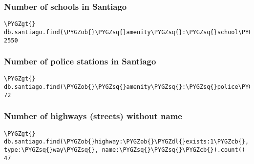 \documentclass[a4paper,10pt,english]{sphinxhowto}
\def\PYGZob{\char`\{}
\def\PYGZcb{\char`\}}
\def\PYGZgt{\char`\>}
\def\PYGZdl{\char`\$}
\def\PYGZsq{\char`\'}
\renewcommand\PYGZsq{\textquotesingle}
\begin{document}
\subsubsection{Number of schools in Santiago}
\label{index:number-of-schools-in-santiago}
\begin{Verbatim}[commandchars=\\\{\}]
\PYGZgt{} db.santiago.find(\PYGZob{}\PYGZsq{}amenity\PYGZsq{}:\PYGZsq{}school\PYGZsq{}\PYGZcb{}).count()
2550
\end{Verbatim}


\subsubsection{Number of police stations in Santiago}
\label{index:number-of-police-stations-in-santiago}
\begin{Verbatim}[commandchars=\\\{\}]
\PYGZgt{} db.santiago.find(\PYGZob{}\PYGZsq{}amenity\PYGZsq{}:\PYGZsq{}police\PYGZsq{}\PYGZcb{}).count()
72
\end{Verbatim}


\subsubsection{Number of highways (streets) without name}
\label{index:number-of-highways-streets-without-name}
\begin{Verbatim}[commandchars=\\\{\}]
\PYGZgt{} db.santiago.find(\PYGZob{}highway:\PYGZob{}\PYGZdl{}exists:1\PYGZcb{}, type:\PYGZsq{}way\PYGZsq{}, name:\PYGZsq{}\PYGZsq{}\PYGZcb{}).count()
47
\end{Verbatim}
\end{document}
